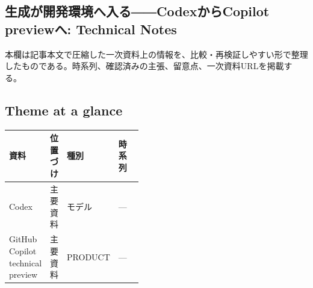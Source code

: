 \subsection*{生成が開発環境へ入る――CodexからCopilot previewへ: Technical Notes}
本欄は記事本文で圧縮した一次資料上の情報を、比較・再検証しやすい形で整理したものである。時系列、確認済みの主張、留意点、一次資料URLを掲載する。
\smallskip
{}\par
\medskip
\subsection*{Theme at a glance}
\begin{center}
\footnotesize
\begin{tabularx}{\linewidth}{@{}p{0.20\linewidth}p{0.10\linewidth}p{0.14\linewidth}X@{}}
\toprule
資料 & 位置づけ & 種別 & 時系列 \\
\midrule
Codex & 主要資料 & モデル & — \\
GitHub Copilot technical preview & 主要資料 & PRODUCT & — \\
\bottomrule
\end{tabularx}
\end{center}
\normalsize

